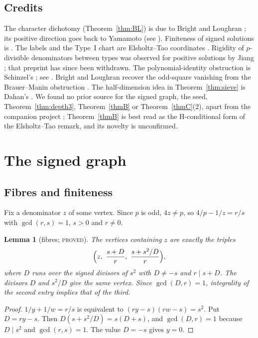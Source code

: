 \documentclass[11pt,reqno]{amsart}
\newtheorem{lemma}[theorem]{Lemma}
\theoremstyle{definition}
\newcommand{\status}[1]{\textsc{#1}}
\begin{document}
\subsection{Credits}
The character dichotomy (Theorem~\ref{thm:BL}) is due to Bright and
Loughran \cite[Thms.~1.2, 1.5]{BL}; its positive direction goes back to
Yamamoto \cite{Yamamoto} (see \cite[App.~A]{BL}).  Finiteness of signed
solutions is \cite[Lemma~3.10]{BL}.  The labels and the Type~I chart are
Elsholtz--Tao coordinates \cite[(2.1), (2.6), (2.7), (2.18), (2.21)]{ET}.
Rigidity of $p$-divisible denominators between types was observed for
positive solutions by Jiang \cite[Thm.~3.2]{Jiang}; that preprint has since
been withdrawn.  The polynomial-identity obstruction is Schinzel's
\cite{Schinzel}; see \cite[p.~8]{ET}.  Bright and Loughran recover the
odd-square vanishing \cite[Prop.~1.6]{ET} from the Brauer--Manin
obstruction \cite[Cor.~1.4]{BL}.  The
half-dimension idea in Theorem~\ref{thm:sieve} is Dahan's
\cite[Lemma~4.2, Thm.~4.3]{Dahan}.  We found no prior source for the
signed graph, the seed, Theorem~\ref{thm:depth3}, Theorem~\ref{thmB} or
Theorem~\ref{thmC}(2), apart from the companion project \cite{AS}; Theorem~\ref{thmB} is best read as the
H-conditional form of the Elsholtz--Tao remark, and its novelty is
unconfirmed.

\section{The signed graph}\label{sec:graph}

\subsection{Fibres and finiteness}
Fix a denominator $z$ of some vertex.  Since $p$ is odd, $4z\ne p$, so
$4/p-1/z=r/s$ with $\gcd(r,s)=1$, $s>0$ and $r\ne0$.

\begin{lemma}[fibres; \status{proved}]\label{lem:fibre}
The vertices containing $z$ are exactly the triples
\[
 \Bigl(z,\ \frac{s+D}{r},\ \frac{s+s^2/D}{r}\Bigr),
\]
where $D$ runs over the signed divisors of $s^2$ with $D\ne-s$ and
$r\mid s+D$.  The divisors $D$ and $s^2/D$ give the same vertex.  Since
$\gcd(D,r)=1$, integrality of the second entry implies that of the third.
\end{lemma}

\begin{proof}
$1/y+1/w=r/s$ is equivalent to $(ry-s)(rw-s)=s^2$.  Put $D=ry-s$.  Then
$D(s+s^2/D)=s(D+s)$, and $\gcd(D,r)=1$ because $D\mid s^2$ and
$\gcd(r,s)=1$.  The value $D=-s$ gives $y=0$.
\end{proof}
\end{document}
